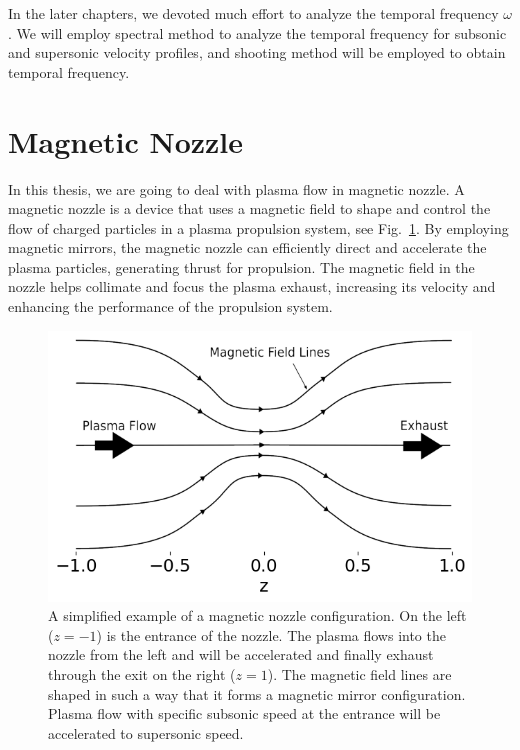 In the later chapters, we devoted much effort to analyze the temporal frequency $\omega$. We will employ spectral method to analyze the temporal frequency for subsonic and supersonic velocity profiles, and shooting method will be employed to obtain temporal frequency.

\section{Magnetic Nozzle}
In this thesis, we are going to deal with plasma flow in magnetic nozzle.
A magnetic nozzle is a device that uses a magnetic field to shape and control the flow of charged particles in a plasma propulsion system, see Fig.~\ref{fig:magnetic-nozzle}. By employing magnetic mirrors, the magnetic nozzle can efficiently direct and accelerate the plasma particles, generating thrust for propulsion. The magnetic field in the nozzle helps collimate and focus the plasma exhaust, increasing its velocity and enhancing the performance of the propulsion system.

\begin{figure}[htbp]
	\centering
	\includegraphics[width=0.7\linewidth]{figures/magnetic-nozzle.png}
	\caption{A simplified example of a magnetic nozzle configuration. On the left ($z=-1$) is the entrance of the nozzle. The plasma flows into the nozzle from the left and will be accelerated and finally exhaust through the exit on the right ($z=1$). The magnetic field lines are shaped in such a way that it forms a magnetic mirror configuration. Plasma flow with specific subsonic speed at the entrance will be accelerated to supersonic speed.}
	\label{fig:magnetic-nozzle}
\end{figure}

